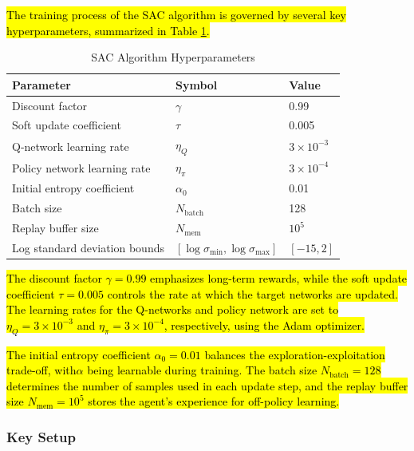\documentclass[preprint,12pt]{elsarticle}
\begin{document}
\hl{The training process of the SAC algorithm is governed by several key hyperparameters, summarized in Table \ref{tab:sac_hyperparameters}.}

\begin{table}[htbp]
\centering
\caption{SAC Algorithm Hyperparameters}
\label{tab:sac_hyperparameters}
\begin{tabular}{|l|l|l|}
\hline
\textbf{Parameter} & \textbf{Symbol} & \textbf{Value} \\
\hline
Discount factor & \(\gamma\) & 0.99 \\
\hline
Soft update coefficient & \(\tau\) & 0.005 \\
\hline
Q-network learning rate & \(\eta_Q\) & \(3 \times 10^{-3}\) \\
\hline
Policy network learning rate & \(\eta_\pi\) & \(3 \times 10^{-4}\) \\
\hline
Initial entropy coefficient & \(\alpha_0\) & 0.01 \\
\hline
Batch size & \(N_{\text{batch}}\) & 128 \\
\hline
Replay buffer size & \(N_{\text{mem}}\) & \(10^5\) \\
\hline
Log standard deviation bounds & \([\log\sigma_{\text{min}}, \log\sigma_{\text{max}}]\) & \([-15, 2]\) \\
\hline
\end{tabular}
\end{table}

\hl{The discount factor $\gamma = 0.99$ emphasizes long-term rewards, while the soft update coefficient $\tau = 0.005$ controls the rate at which the target networks are updated. The learning rates for the Q-networks and policy network are set to $\eta_Q = 3 \times 10^{-3}$ and $\eta_\pi = 3 \times 10^{-4}$, respectively, using the Adam optimizer.}

\hl{The initial entropy coefficient $\alpha_0 = 0.01$ balances the exploration-exploitation trade-off, with$\alpha$ being learnable during training. The batch size $N_{\text{batch}} = 128$ determines the number of samples used in each update step, and the replay buffer size $N_{\text{mem}} = 10^5$ stores the agent's experience for off-policy learning.}

\subsubsection{Key Setup}
\end{document}
